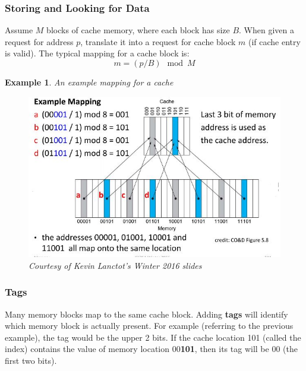\documentclass{report}
\newtheorem{ex}{Example}[section]
\begin{document}
\subsubsection{Storing and Looking for Data}
Assume $M$ blocks of cache memory, where each block has size $B$. When given a request for address $p$, translate it into a request for cache block $m$ (if cache entry is valid). The typical mapping for a cache block is:
$$m = (p/B)\mod M$$
\begin{ex}
An example mapping for a cache
\end{ex}
\begin{figure}[ht]
\begin{center}
\includegraphics[scale=0.7]{direct_map1.jpg}
\end{center}
\caption{\textit{Courtesy of Kevin Lanctot's Winter 2016 slides}}
\end{figure}
\subsubsection{Tags}
Many memory blocks map to the same cache block. Adding \textbf{tags} will identify which memory block is actually present. For example (referring to the previous example), the tag would be the upper 2 bits. If the cache location 101 (called the index) contains the value of memory location 00\textbf{101}, then its tag will be 00 (the first two bits).
\end{document}
